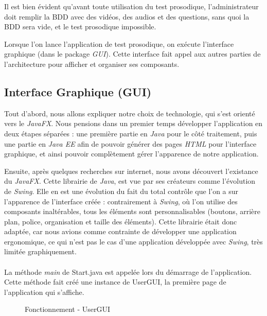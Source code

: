 Il est bien évident qu'avant toute utilisation du test prosodique, l'administrateur doit remplir la BDD avec des vidéos, des audios et des questions, sans quoi la BDD sera vide, et le test prosodique impossible.

Lorsque l'on lance l'application de test prosodique, on exécute l'interface graphique (dans le package \textit{GUI}). Cette interface fait appel aux autres parties de l'architecture pour afficher et organiser ses composants.

\subsection{Interface Graphique (GUI)}\label{GUI}

Tout d'abord, nous allons expliquer notre choix de technologie, qui s'est orienté vers le \textit{JavaFX}.
Nous pensions dans un premier temps développer l'application en deux étapes séparées : une première partie en \textit{Java} pour le côté traitement, puis une partie en \textit{Java EE} afin de pouvoir générer des pages \textit{HTML} pour l'interface graphique, et ainsi pouvoir complètement gérer l'apparence de notre application. 

Ensuite, après quelques recherches sur internet, nous avons découvert l'existance du \textit{JavaFX}.
Cette librairie de \textit{Java}, est vue par ses créateurs comme l'évolution de \textit{Swing}.
Elle en est une évolution du fait du total contrôle que l'on a sur l'apparence de l'interface créée : contrairement à \textit{Swing}, où l'on utilise des composants inaltérables, tous les éléments sont personnalisables (boutons, arrière plan, police, organisation et taille des éléments).
Cette librairie était donc adaptée, car nous avions comme contrainte de développer une application ergonomique, ce qui n'est pas le cas d'une application développée avec \textit{Swing}, très limitée graphiquement.\\
\\


La méthode \textit{main} de Start.java est appelée lors du démarrage de l'application. Cette méthode fait créé une instance de UserGUI, la première page de l'application qui s'affiche.

\begin{figure}[!ht]
\begin{center}
  \caption{Fonctionnement - UserGUI}
  \label{UserGUI} 
\end{center}
\end{figure}

